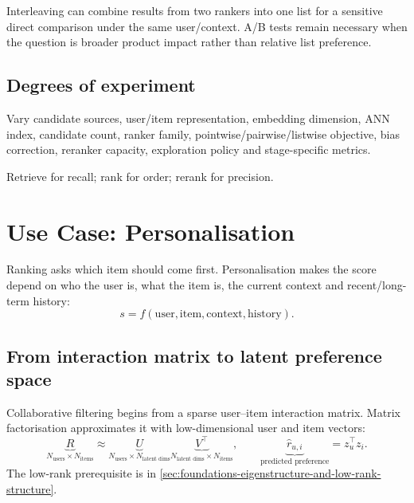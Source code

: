 Interleaving can combine results from two rankers into one list for a sensitive direct comparison under the same user/context.
A/B tests remain necessary when the question is broader product impact rather than relative list preference.

\subsection{Degrees of experiment}
\label{sec:ranking-optionality}
\begin{calloutdegreeofexperiment}
Vary candidate sources, user/item representation, embedding dimension, ANN index, candidate count, ranker family, pointwise/pairwise/listwise objective, bias correction, reranker capacity, exploration policy and stage-specific metrics.
\end{calloutdegreeofexperiment}

\begin{calloutmemoryhook}
Retrieve for recall; rank for order; rerank for precision.
\end{calloutmemoryhook}

\section{Use Case: Personalisation}
\label{chap:personalisation}
Ranking asks which item should come first.
Personalisation makes the score depend on who the user is, what the item is, the current context and recent/long-term history:
\[
\boxed{
s
=
f(
\text{user},
\text{item},
\text{context},
\text{history}
).
}
\]

\subsection{From interaction matrix to latent preference space}
\label{sec:personalisation-matrix-factorisation}
Collaborative filtering begins from a sparse user--item interaction matrix.
Matrix factorisation approximates it with low-dimensional user and item vectors:
\[
\underbrace{R}_{N_{\text{users}}\times N_{\text{items}}}
\approx
\underbrace{U}_{N_{\text{users}}\times N_{\text{latent dims}}}
\underbrace{V^\top}_{N_{\text{latent dims}}\times N_{\text{items}}},
\qquad
\underbrace{\hat r_{u,i}}_{\text{predicted preference}}
=
z_u^\top z_i.
\]
The low-rank prerequisite is in \cref{sec:foundations-eigenstructure-and-low-rank-structure}.

